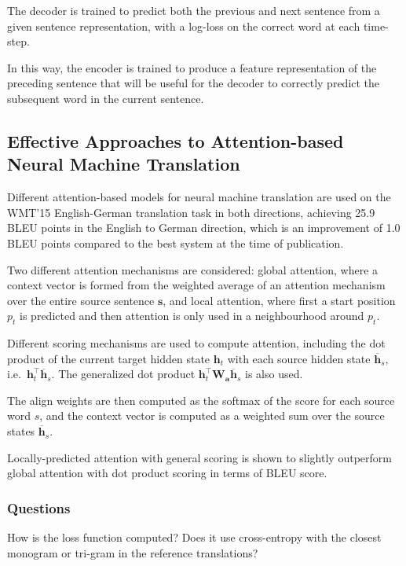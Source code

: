 \documentclass[a4paper, 12pt]{article}
\begin{document}
The decoder is trained to predict both the previous and next sentence from a
given sentence representation, with a log-loss on the correct word at each
time-step.

In this way, the encoder is trained to produce a feature representation of the
preceding sentence that will be useful for the decoder to correctly predict the
subsequent word in the current sentence.


\subsection{Effective Approaches to Attention-based Neural Machine
            Translation~\citet{DBLP:journals/corr/LuongPM15}}

Different attention-based models for neural machine translation are used on the
WMT'15 English-German translation task in both directions, achieving 25.9 BLEU
points in the English to German direction, which is an improvement of 1.0 BLEU
points compared to the best system at the time of publication.

Two different attention mechanisms are considered: global attention, where a
context vector is formed from the weighted average of an attention mechanism
over the entire source sentence $\mathbf{s}$, and local attention, where first
a start position $p_t$ is predicted and then attention is only used in a
neighbourhood around $p_t$.

Different scoring mechanisms are used to compute attention, including the dot
product of the current target hidden state $\mathbf{h}_t$ with each source
hidden state $\overline{\mathbf{h}}_s$, i.e.\
$\mathbf{h}_t^\intercal \overline{\mathbf{h}}_s$. The generalized dot product
$\mathbf{h}_t^\intercal \mathbf{W}_\mathbf{a} \overline{\mathbf{h}}_s$ is also
used.

The align weights are then computed as the softmax of the score for each source
word $s$, and the context vector is computed as a weighted sum over the source
states $\overline{\mathbf{h}}_s$.

Locally-predicted attention with general scoring is shown to slightly
outperform global attention with dot product scoring in terms of BLEU score.

\subsubsection{Questions}

How is the loss function computed? Does it use cross-entropy with the closest
monogram or tri-gram in the reference translations?
\end{document}
